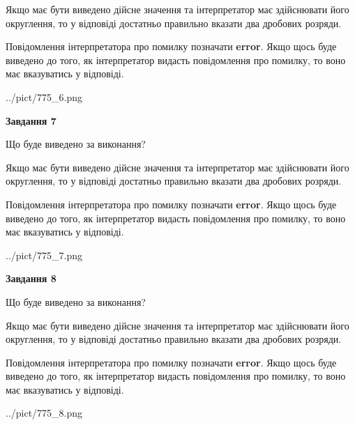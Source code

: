 \documentclass[12pt, ukrainian]{article}
\begin{document}
{\begin {Large}
Якщо має бути виведено дійсне значення та інтерпретатор має здійснювати його округлення, 
то у відповіді достатньо правильно вказати два дробових розряди.

Повідомлення інтерпретатора про помилку позначати \textbf{error}.
Якщо щось буде виведено до того, як інтерпретатор видасть повідомлення про помилку, 
то воно має вказуватись у відповіді. \par

\begin{center}
	{../pict/775_6.png}
\end{center}
\newpage

{\begin {center}\textbf{Завдання 7}\end {center}}\par
Що буде виведено за виконання? \par

Якщо має бути виведено дійсне значення та інтерпретатор має здійснювати його округлення, 
то у відповіді достатньо правильно вказати два дробових розряди.

Повідомлення інтерпретатора про помилку позначати \textbf{error}.
Якщо щось буде виведено до того, як інтерпретатор видасть повідомлення про помилку, 
то воно має вказуватись у відповіді. \par

\begin{center}
	{../pict/775_7.png}
\end{center}
\newpage

{\begin {center}\textbf{Завдання 8}\end {center}}\par
Що буде виведено за виконання? \par

Якщо має бути виведено дійсне значення та інтерпретатор має здійснювати його округлення, 
то у відповіді достатньо правильно вказати два дробових розряди.

Повідомлення інтерпретатора про помилку позначати \textbf{error}.
Якщо щось буде виведено до того, як інтерпретатор видасть повідомлення про помилку, 
то воно має вказуватись у відповіді. \par

\begin{center}
	{../pict/775_8.png}
\end{center}
\newpage


\end{Large}}
\end{document}
